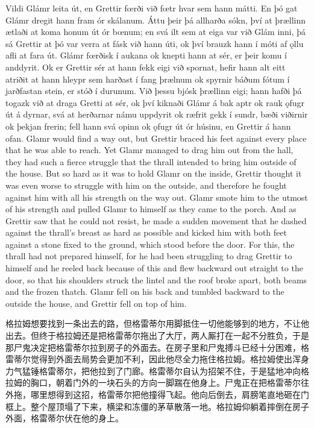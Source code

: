 \begin{paracol}{2}
  Vildi Glámr leita út, en Grettir fœrði við fœtr hvar sem hann mátti. En þó gat Glámr dregit hann fram ór skálanum. Áttu þeir þá allharða sókn, því at þrællinn ætlaði at koma honum út ór bœnum; en svá ilt sem at eiga var við Glám inni, þá sá Grettir at þó var verra at fásk við hann úti, ok því brauzk hann í móti af ǫllu afli at fara út. Glámr fœrðisk í aukana ok knepti hann at sér, er þeir komu í anddyrit. Ok er Grettir sér at hann fekk eigi við spornat, hefir hann alt eitt atriðit at hann hleypr sem harðast í fang þrælnum ok spyrnir báðum fótum í jarðfastan stein, er stóð í durunum. Við þessu bjósk þrællinn eigi; hann hafði þá togazk við at draga Gretti at sér, ok því kiknaði Glámr á bak aptr ok rauk ǫfugr út á dyrnar, svá at herðarnar námu uppdyrit ok ræfrit gekk í sundr, bæði viðirnir ok þekjan frerin; fell hann svá opinn ok ǫfugr út ór húsinu, en Grettir á hann ofan.
  \switchcolumn
  Glamr would find a way out, but Grettir braced his feet against every place that he was able to reach. Yet Glamr managed to drag him out from the hall, they had such a fierce struggle that the thrall intended to bring him outside of the house. But so hard as it was to hold Glamr on the inside, Grettir thought it was even worse to struggle with him on the outside, and therefore he fought against him with all his strength on the way out. Glamr smote him to the utmost of his strength and pulled Glamr to himself as they came to the porch. And as Grettir saw that he could not resist, he made a sudden movement that he dashed against the thrall's breast as hard as possible and kicked him with both feet against a stone fixed to the ground, which stood before the door. For this, the thrall had not prepared himself, for he had been struggling to drag Grettir to himself and he reeled back because of this and flew backward out straight to the door, so that his shoulders struck the lintel and the roof broke apart, both beams and the frozen thatch. Glamr fell on his back and tumbled backward to the outside the house, and Grettir fell on top of him.
\end{paracol}
\begin{translation*}{}
  格拉姆想要找到一条出去的路，但格雷蒂尔用脚抵住一切他能够到的地方，不让他出去。但终于格拉姆还是把格雷蒂尔拖出了大厅，两人厮打在一起不分胜负，于是那尸鬼决定把格雷蒂尔拉到房子的外面去。在房子里和尸鬼搏斗已经十分困难，格雷蒂尔觉得到外面去局势会更加不利，因此他尽全力拖住格拉姆。格拉姆使出浑身力气猛锤格雷蒂尔，把他拉到了门廊。格雷蒂尔自认为招架不住，于是猛地冲向格拉姆的胸口，朝着门外的一块石头的方向一脚踹在他身上。尸鬼正在把格雷蒂尔往外拖，哪里想得到这招，格雷蒂尔把他撞得飞起。他向后倒去，肩膀笔直地砸在门框上。整个屋顶塌了下来，横梁和冻僵的茅草散落一地。格拉姆仰躺着摔倒在房子外面，格雷蒂尔伏在他的身上。
\end{translation*}
